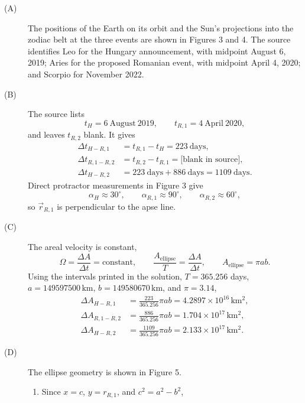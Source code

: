 \begin{description}
\item[(A)] The positions of the Earth on its orbit and the Sun's projections
  into the zodiac belt at the three events are shown in Figures 3 and 4.
  The source identifies Leo for the Hungary announcement, with midpoint
  August 6, 2019; Aries for the proposed Romanian event, with midpoint
  April 4, 2020; and Scorpio for November 2022.
\item[(B)] The source lists
  \[
  t_H=6\ \mathrm{August}\ 2019,\qquad
  t_{R,1}=4\ \mathrm{April}\ 2020,
  \]
  and leaves $t_{R,2}$ blank. It gives
  \begin{align*}
  \Delta t_{H-R,1}&=t_{R,1}-t_H=223\ \mathrm{days},\\
  \Delta t_{R,1-R,2}&=t_{R,2}-t_{R,1}=\text{[blank in source]},\\
  \Delta t_{H-R,2}&=223\ \mathrm{days}+886\ \mathrm{days}=1109\ \mathrm{days}.
  \end{align*}
  Direct protractor measurements in Figure 3 give
  \[
  \alpha_H\approx30^\circ,\qquad \alpha_{R,1}\approx90^\circ,
  \qquad \alpha_{R,2}\approx60^\circ,
  \]
  so $\vec r_{R,1}$ is perpendicular to the apse line.
\item[(C)] The areal velocity is constant,
  \[
  \Omega=\frac{\Delta A}{\Delta t}=\text{constant},\qquad
  \frac{A_{\mathrm{ellipse}}}{T}=\frac{\Delta A}{\Delta t},\qquad
  A_{\mathrm{ellipse}}=\pi ab.
  \]
  Using the intervals printed in the solution, $T=365.256$ days,
  $a=149597500\,\mathrm{km}$, $b=149580670\,\mathrm{km}$, and $\pi=3.14$,
  \begin{align*}
  \Delta A_{H-R,1}
    &=\frac{223}{365.256}\pi ab=4.2897\times10^{16}\,\mathrm{km^2},\\
  \Delta A_{R,1-R,2}
    &=\frac{886}{365.256}\pi ab=1.704\times10^{17}\,\mathrm{km^2},\\
  \Delta A_{H-R,2}
    &=\frac{1109}{365.256}\pi ab=2.133\times10^{17}\,\mathrm{km^2}.
  \end{align*}
\item[(D)] The ellipse geometry is shown in Figure 5.
  \begin{enumerate}
  \item Since $x=c$, $y=r_{R,1}$, and $c^2=a^2-b^2$,

\end{enumerate}
\end{description}
